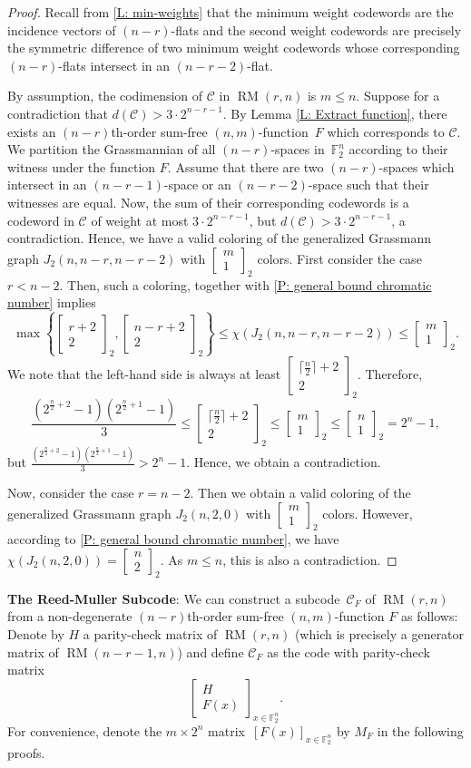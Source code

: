 \documentclass[12pt]{article}
\theoremstyle{definition}
\newcommand{\Gauss}[2]{{\begin{bmatrix} #1 \\ #2 \end{bmatrix}_2}}
\newcommand{\F}{\mathbb F}
\newcommand{\Fpnv}{\mathbb{F}_2^n}
\DeclareMathOperator{\RM}{RM}
\newcounter{numb}
\begin{document}
\begin{proof}
    Recall from \cref{L: min-weights} that the minimum weight codewords are the incidence vectors of $(n-r)$-flats and the second weight codewords are precisely the symmetric difference of two minimum weight codewords whose corresponding $(n-r)$-flats intersect in an $(n-r-2)$-flat.
    
    By assumption, the codimension of $\mathcal{C}$ in $\RM(r,n)$ is $m \leq n$. Suppose for a contradiction that $d(\mathcal{C}) > 3\cdot 2^{n-r-1}$. By Lemma \ref{L: Extract function}, there exists an $(n-r)$th-order sum-free $(n, m)$-function~$F$ which corresponds to $\mathcal{C}$. We partition the Grassmannian of all $(n-r)$-spaces in~$\F_2^n$ according to their witness under the function $F$.
    Assume that there are two $(n-r)$-spaces which intersect in an $(n-r-1)$-space or an $(n-r-2)$-space such that their witnesses are equal. Now, the sum of their corresponding codewords is a codeword in $\mathcal{C}$ of weight at most $3\cdot 2^{n-r-1}$, but $d(\mathcal{C}) > 3\cdot 2^{n-r-1}$, a contradiction.
    Hence, we have a valid coloring of the generalized Grassmann graph $J_2(n, n-r, n-r-2)$ with $\Gauss{m}{1}$ colors. First consider the case $r<n-2$. Then, such a coloring, together with \cref{P: general bound chromatic number} implies
\[
  \max\left\{ \Gauss{r+2}{2}, \Gauss{n-r+2}{2} \right\}\le \chi(J_2(n, n-r, n -r-2)) \le \Gauss{m}{1}.
\]
 We note that the left-hand side is always at least $\Gauss{ \lceil\frac{n}{2}\rceil + 2}{2}$. Therefore,
$$
\frac{(2^{\frac{n}{2} + 2}-1)(2^{\frac{n}{2} + 1} - 1)}{3} \leq \Gauss{ \lceil\frac{n}{2}\rceil + 2}{2} \leq \Gauss{m}{1} \leq \Gauss{n}{1} = 2^n - 1,
$$
but $\frac{(2^{\frac{n}{2} + 2}-1)(2^{\frac{n}{2} + 1} - 1)}{3}>2^n - 1$. Hence, we obtain a contradiction.\par

Now, consider the case $r=n-2$. Then we obtain a valid coloring of the generalized Grassmann graph $J_2(n, 2, 0)$ with $\Gauss{m}{1}$ colors. However, according to \cref{P: general bound chromatic number}, we have $\chi(J_2(n, 2, 0)) = \Gauss{n}{2}$. As $m\leq n$, this is also a contradiction.
\end{proof} 



\noindent \textbf{The Reed-Muller Subcode}: 
We can construct a subcode~$\mathcal{C}_F$ of $\RM(r,n)$ from a non-degenerate $(n-r)$th-order sum-free $(n,m)$-function $F$ as follows: Denote by $H$ a parity-check matrix of $\RM(r,n)$ (which is precisely a generator matrix of $\RM(n-r-1,n)$) and define $\mathcal{C}_F$ as the code with parity-check matrix
\[
\begin{bmatrix}
    H\\
    F(x)
\end{bmatrix}_{x\in\Fpnv}.
\]
For convenience, denote the $m\times2^n$ matrix~$[F(x)]_{x\in\Fpnv}$ by $M_F$ in the following proofs.
\end{document}
